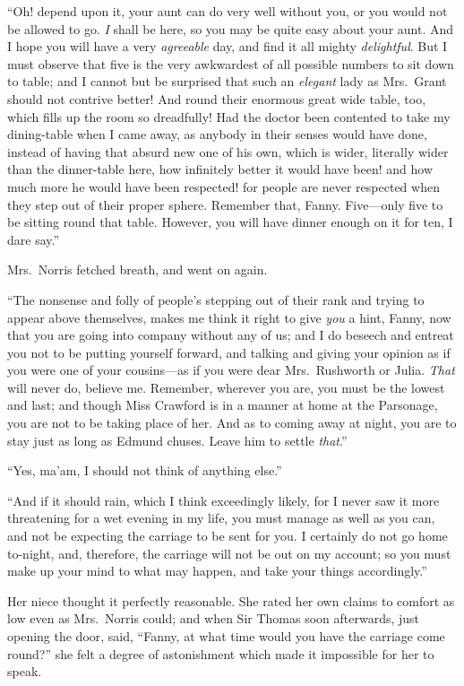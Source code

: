 \documentclass{article}
\begin{document}
``Oh! depend upon it, your aunt can do very well without you,
or you would not be allowed to go.  \emph{I} shall be here, so you
may be quite easy about your aunt.  And I hope you will have
a very \emph{agreeable} day, and find it all mighty \emph{delightful}.
But I must observe that five is the very awkwardest of
all possible numbers to sit down to table; and I cannot
but be surprised that such an \emph{elegant} lady as Mrs.\ Grant
should not contrive better!  And round their enormous great
wide table, too, which fills up the room so dreadfully!
Had the doctor been contented to take my dining-table when I
came away, as anybody in their senses would have done,
instead of having that absurd new one of his own,
which is wider, literally wider than the dinner-table here,
how infinitely better it would have been! and how much
more he would have been respected! for people are never
respected when they step out of their proper sphere.
Remember that, Fanny.  Five---only five to be sitting
round that table.  However, you will have dinner enough
on it for ten, I dare say.''

Mrs.\ Norris fetched breath, and went on again.

``The nonsense and folly of people's stepping out of their
rank and trying to appear above themselves, makes me
think it right to give \emph{you} a hint, Fanny, now that you
are going into company without any of us; and I do beseech
and entreat you not to be putting yourself forward,
and talking and giving your opinion as if you were one of
your cousins---as if you were dear Mrs.\ Rushworth or Julia.
\emph{That} will never do, believe me.  Remember, wherever you are,
you must be the lowest and last; and though Miss Crawford
is in a manner at home at the Parsonage, you are not to
be taking place of her.  And as to coming away at night,
you are to stay just as long as Edmund chuses.
Leave him to settle \emph{that}.''

``Yes, ma'am, I should not think of anything else.''

``And if it should rain, which I think exceedingly likely,
for I never saw it more threatening for a wet evening
in my life, you must manage as well as you can, and not be
expecting the carriage to be sent for you.  I certainly
do not go home to-night, and, therefore, the carriage will
not be out on my account; so you must make up your mind
to what may happen, and take your things accordingly.''

Her niece thought it perfectly reasonable.  She rated her
own claims to comfort as low even as Mrs.\ Norris could;
and when Sir Thomas soon afterwards, just opening
the door, said, ``Fanny, at what time would you have the
carriage come round?'' she felt a degree of astonishment
which made it impossible for her to speak.
\end{document}
